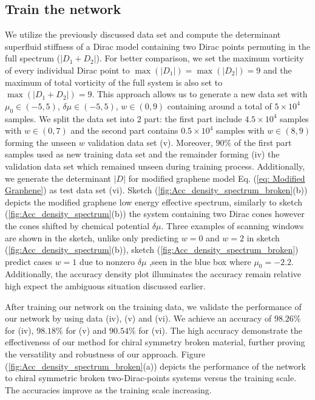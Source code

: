 \documentclass{article}
\begin{document}
\subsection{Train the network}
We utilize the previously discussed data set and compute the determinant superfluid stiffness of a Dirac model containing two Dirac points permuting in the full spectrum ($ |D_1 + D_2| $). For better comparison, we set the maximum vorticity of every individual Dirac point to $ \max(|D_1|) = \max(|D_2|) =  9 $ and the maximum of total vorticity of the full system is also set to $ \max(|D_1 + D_2|) = 9 $.  This approach allows us to generate a new data set with $ \mu_0 \in \left(-5,5\right) $, $ \delta \mu \in \left(-5,5\right) $, $ w \in \left(0,9\right) $ containing around a total of $ 5 \times 10^4 $ samples. We split the data set into 2 part: the first part include $ 4.5 \times 10^4 $ samples with $ w \in \left(0,7\right) $ and the second part contains $ 0.5 \times 10^4 $ samples with $ w \in \left(8,9\right) $ forming the unseen $ w $ validation data set (v). Moreover, $ 90 \% $ of the first part samples used as new training data set and the remainder forming (iv) the validation data set which remained unseen during training process. Additionally, we generate the determinant $ |D| $ for modified graphene model Eq. (\ref{eq: Modified Graphene}) as test data set (vi). Sketch (\ref{fig:Acc_density_spectrum_broken}(b)) depicts the modified graphene low energy effective spectrum, similarly to sketch (\ref{fig:Acc_density_spectrum}(b)) the system containing two Dirac cones however the cones shifted by chemical potential $ \delta \mu $. Three examples of scanning windows are shown in the sketch, unlike only predicting $ w=0 $ and $ w=2 $ in sketch (\ref{fig:Acc_density_spectrum}(b)), sketch (\ref{fig:Acc_density_spectrum_broken}) predict cases $ w=1 $ due to nonzero $ \delta \mu $ ,seen in the blue box where $ \mu_0=-2.2 $.  Additionally, the accuracy density plot illuminates the accuracy remain relative high expect the ambiguous situation discussed earlier. 

After training our network on the training data, we validate the performance of our network by using data (iv), (v) and (vi). We achieve an accuracy of $ 98.26 \% $ for (iv), $ 98.18 \% $ for (v) and $ 90.54\% $ for (vi). The high accuracy demonstrate the effectiveness of our method for chiral symmetry broken material, further proving the versatility and robustness of our approach. Figure (\ref{fig:Acc_density_spectrum_broken}(a)) depicts the performance of the network to chiral symmetric broken two-Dirac-points systems versus the training scale. The accuracies improve as the training scale increasing.    
\end{document}
